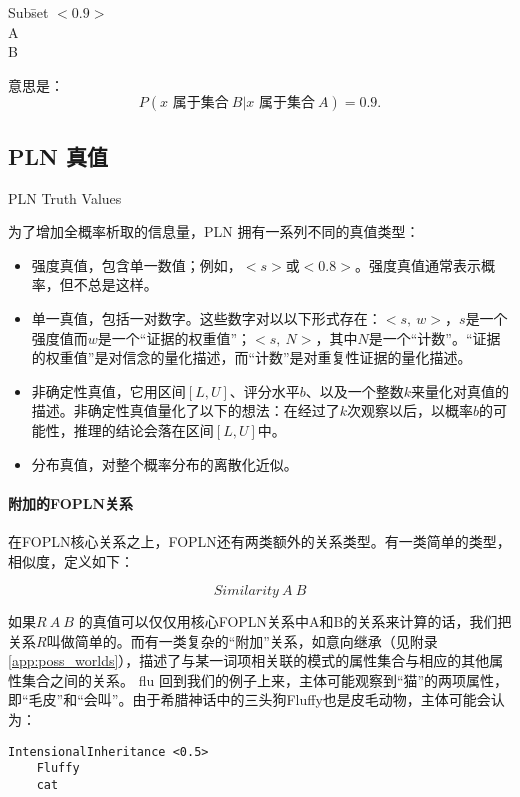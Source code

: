 \begin{tabbing}
Sub\=set $<0.9>$\\
\>A\\
\>B\\
\end{tabbing}

意思是：$$P(x \mbox{ 属于集合}\ B\vert x \mbox{ 属于集合}\ A) = 0.9.$$ 

\subsection{PLN 真值}{PLN Truth Values}

为了增加全概率析取的信息量，PLN 拥有一系列不同的真值类型：

\begin{itemize}
\item 强度真值，包含单一数值；例如，$<s>$或$<0.8>$。强度真值通常表示概率，但不总是这样。
\item 单一真值，包括一对数字。这些数字对以以下形式存在：$<s,\ w>$，$s$是一个强度值而$w$是一个“证据的权重值”；$<s,\ N>$，其中$N$是一个“计数”。“证据的权重值”是对信念的量化描述，而“计数”是对重复性证据的量化描述。
\item 非确定性真值，它用区间$[L,U]$、评分水平$b$、以及一个整数$k$来量化对真值的描述。非确定性真值量化了以下的想法：在经过了$k$次观察以后，以概率$b$的可能性，推理的结论会落在区间$[L,U]$中。
\item 分布真值，对整个概率分布的离散化近似。
\end{itemize}

\paragraph{附加的FOPLN关系}

在FOPLN核心关系之上，FOPLN还有两类额外的关系类型。有一类简单的类型，相似度，定义如下：

$$
Similarity \ A \ B
$$

如果$R \ A \ B$ 的真值可以仅仅用核心FOPLN关系中A和B的关系来计算的话，我们把关系$R$叫做简单的。而有一类复杂的“附加”关系，如意向继承（见附录\ref{app:poss_worlds}），描述了与某一词项相关联的模式的属性集合与相应的其他属性集合之间的关系。
flu
回到我们的例子上来，主体可能观察到“猫”的两项属性，即“毛皮”和“会叫”。由于希腊神话中的三头狗Fluffy也是皮毛动物，主体可能会认为：

{\tt\begin{small}\begin{lstlisting}
IntensionalInheritance <0.5>
	Fluffy  
	cat
\end{lstlisting}\end{small}}

